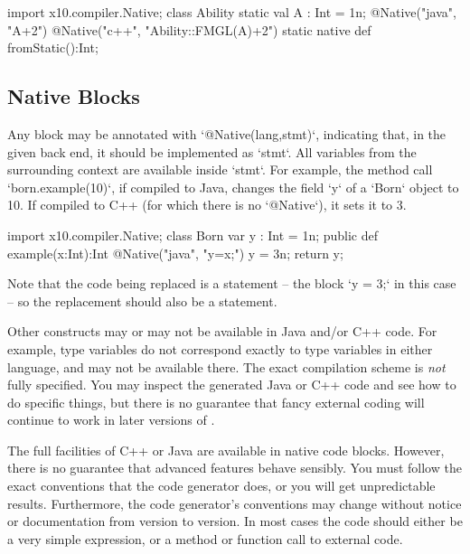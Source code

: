 \begin{xten}
import x10.compiler.Native;
class Ability {
  static val A : Int = 1n;
  @Native("java", "A+2")
  @Native("c++", "Ability::FMGL(A)+2")
  static native def fromStatic():Int;
}
\end{xten}
%




\subsection{Native Blocks}

Any block may be annotated with \xcd`@Native(lang,stmt)`, indicating that, in
the given back end, it should be implemented as \xcd`stmt`. All 
variables  from the surrounding context are available inside \xcd`stmt`. For
example, the method call \xcd`born.example(10)`, if compiled to Java, changes
the field \xcd`y` of a \xcd`Born` object to 10. If compiled to C++ (for which
there is no \xcd`@Native`), it sets it to 3. 
\begin{xten}
import x10.compiler.Native;
class Born {
  var y : Int = 1n; 
  public def example(x:Int):Int{
    @Native("java", "y=x;") 
    {y = 3n;}
    return y;
  }
}
\end{xten}
%

Note that the code being replaced is a statement -- the block \xcd`{y = 3;}`
in this case -- so the replacement should also be a statement. 


Other \Xten{} constructs may or may not be available in Java and/or C++ code.  For
example, type variables do not correspond exactly to type variables in either
language, and may not be available there.  The exact compilation scheme is
{\em not} fully specified.  You may inspect the generated Java or C++ code and
see how to do specific things, but there is no guarantee that fancy external
coding will continue to work in later versions of \Xten{}.



The full facilities of C++ or Java are available in native code blocks.
However, there is no guarantee that advanced features behave sensibly. You
must follow the exact conventions that the code generator does, or you will
get unpredictable results.  Furthermore, the code generator's conventions may
change without notice or documentation from version to version.  In most cases
the  code should either be a very simple expression, or a method
or function call to external code.


